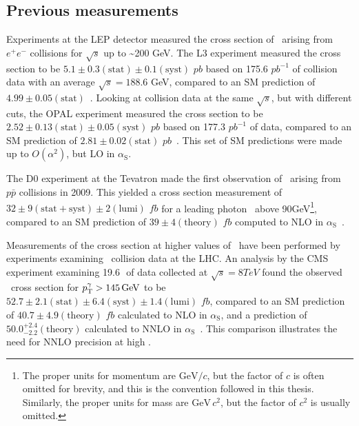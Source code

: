 \subsection{Previous measurements} \label{sec:introduction_znng_previous_measurements}
Experiments at the LEP detector measured the cross section of \zinvg\ arising from $e^{\mathrm{+}}e^{\mathrm{-}}$ collisions for $\sqrt{s}$ up to \textasciitilde200 GeV.
The L3 experiment measured the cross section to be $5.1 \pm 0.3\mathrm{(stat)} \pm 0.1\mathrm{(syst)}$ $pb$ based on 175.6 $pb^{-1}$ of collision data with an average $\sqrt{s} = 188.6$ GeV, compared to an SM
prediction of $4.99 \pm 0.05\mathrm{(stat)}$~\cite{ref:j.physletb.2004.07.002}. Looking at collision data at the same $\sqrt{s}$, but with different cuts,
the OPAL experiment measured the cross section to be $2.52 \pm 0.13\mathrm{(stat)} \pm 0.05\mathrm{(syst)}$ $pb$ based on 177.3 $pb^{-1}$ of data, compared to an SM
prediction of $2.81 \pm 0.02\mathrm{(stat)}$ $pb$~\cite{}. This set of SM predictions were made up to $O(\alpha^2)$, but LO in $\alpha_\mathrm{S}$.

The D0 experiment at the Tevatron made the first observation of \zinvg\ arising from $p\bar{p}$ collisions in 2009. This yielded a cross section measurement of
$32 \pm 9\mathrm{(stat+syst)} \pm 2\mathrm{(lumi)}$ $fb$ for a leading photon \pT\ above 90\unit{GeV}\footnote{The proper units for momentum are $\mathrm{GeV}/c$, but the
factor of $c$ is often omitted for brevity, and this is the convention followed in this thesis. Similarly, the proper units for mass are $\mathrm{GeV}\,c^{2}$, but the factor
of $c^{2}$ is usually omitted.},
compared to an SM prediction of $39 \pm 4\mathrm{(theory)}$ $fb$ computed to NLO in $\alpha_\mathrm{S}$~\cite{ref:PhysRevLett.102.201802}.

Measurements of the cross section at higher values of \pTgamma\ have been performed by experiments examining \Pp\Pp\ collision data at the LHC.
An analysis by the CMS experiment examining 19.6\,\fbinv\ of data collected at $\sqrt{s} = 8\unit{TeV}$ found the observed \zinvg\ cross section for $\pTgamma > 145\unit{GeV}$ to be
$52.7 \pm 2.1\mathrm{(stat)} \pm 6.4\mathrm{(syst)} \pm 1.4\mathrm{(lumi)}$ $fb$, compared to an SM prediction of $40.7 \pm 4.9\mathrm{(theory)}$ $fb$ calculated to NLO in $\alpha_\mathrm{S}$, and
a prediction of $50.0^{+2.4}_{-2.2}\mathrm{(theory)}$ calculated to NNLO in $\alpha_\mathrm{S}$~\cite{ref:j.physletb.2016.06.080}. This comparison illustrates the need for NNLO precision at high \pTgamma.

